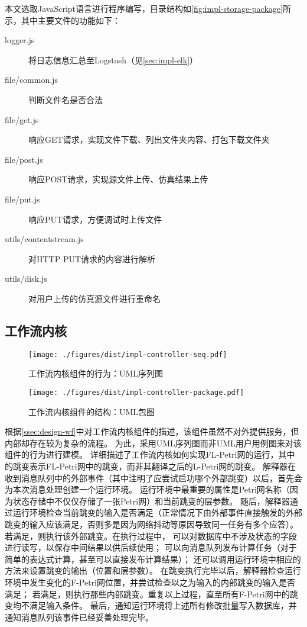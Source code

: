 \documentclass[index]{subfiles}
\begin{document}
本文选取JavaScript语言进行程序编写，目录结构如\cref{fig:impl-storage-package}所示，其中主要文件的功能如下：
\begin{description}
  \item[logger.js] 将日志信息汇总至Logstash（见\cref{sec:impl-elk}）
  \item[file/common.js] 判断文件名是否合法
  \item[file/get.js] 响应GET请求，实现文件下载、列出文件夹内容、打包下载文件夹
  \item[file/post.js] 响应POST请求，实现源文件上传、仿真结果上传
  \item[file/put.js] 响应PUT请求，方便调试时上传文件
  \item[utils/contentstream.js] 对HTTP PUT请求的内容进行解析
  \item[utils/disk.js] 对用户上传的仿真源文件进行重命名
\end{description}

\subsection{工作流内核}
\begin{figure}[h]
  \centering
  \texttt{[image: ./figures/dist/impl-controller-seq.pdf]}
  \caption{工作流内核组件的行为：UML序列图\label{fig:impl-controller-seq}}
\end{figure}
\begin{figure}[h]
  \centering
  \texttt{[image: ./figures/dist/impl-controller-package.pdf]}
  \caption{工作流内核组件的结构：UML包图\label{fig:impl-controller-package}}
\end{figure}
根据\cref{ssec:design-wf}中对工作流内核组件的描述，该组件虽然不对外提供服务，但内部却存在较为复杂的流程。
为此，采用UML序列图而非UML用户用例图来对该组件的行为进行建模。
详细描述了工作流内核如何实现FL-Petri网的运行，其中的跳变表示FL-Petri网中的跳变，而非其翻译之后的L-Petri网的跳变。
解释器在收到消息队列中的外部事件（其中注明了应尝试启功哪个外部跳变）以后，首先会为本次消息处理创建一个运行环境。
运行环境中最重要的属性是Petri网名称（因为状态存储中不仅仅存储了一张Petri网）和当前跳变的层参数。
随后，解释器通过运行环境检查当前跳变的输入是否满足（正常情况下由外部事件直接触发的外部跳变的输入应该满足，否则多是因为网络抖动等原因导致同一任务有多个应答）。
若满足，则执行该外部跳变。在执行过程中，
可以对数据库中不涉及状态的字段进行读写，以保存中间结果以供后续使用；
可以向消息队列发布计算任务（对于简单的表达式计算，甚至可以直接发布计算结果）；
还可以调用运行环境中相应的方法来设置跳变的输出（位置和层参数）。
在跳变执行完毕以后，解释器检查运行环境中发生变化的F-Petri网位置，并尝试检查以之为输入的内部跳变的输入是否满足；
若满足，则执行那些内部跳变。重复以上过程，直至所有F-Petri网中的跳变均不满足输入条件。
最后，通知运行环境将上述所有修改批量写入数据库，并通知消息队列该事件已经妥善处理完毕。
\end{document}
